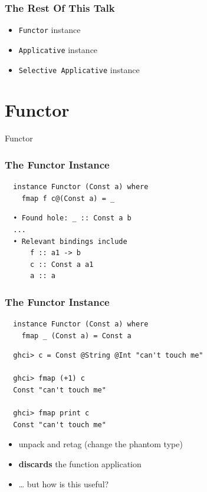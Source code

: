 \documentclass[aspectratio=169]{beamer}
\begin{document}
\begin{frame}
  \frametitle{The Rest Of This Talk}
  \begin{itemize}
  \item \texttt{Functor} instance
  \item \texttt{Applicative} instance
  \item \texttt{Selective Applicative} instance
  \end{itemize}
\end{frame}

\section{Functor}
\begin{frame}
  \begin{center}
    \Huge Functor
  \end{center}
\end{frame}

\begin{frame}[fragile,t]
  \frametitle{The Functor Instance}
  \begin{verbatim}
  instance Functor (Const a) where
    fmap f c@(Const a) = _
  \end{verbatim}
  \vspace{5mm}
  \begin{verbatim}
  • Found hole: _ :: Const a b
  ...
  • Relevant bindings include
      f :: a1 -> b
      c :: Const a a1
      a :: a
  \end{verbatim}
\end{frame}

\begin{frame}[fragile,t]
  \frametitle{The Functor Instance}
  \begin{verbatim}
  instance Functor (Const a) where
    fmap _ (Const a) = Const a
  \end{verbatim}
  \vspace{5mm}
  \begin{verbatim}
  ghci> c = Const @String @Int "can't touch me"

  ghci> fmap (+1) c
  Const "can't touch me"

  ghci> fmap print c
  Const "can't touch me"
  \end{verbatim}
  \vfill
  \begin{itemize}
  \item unpack and retag (change the phantom type)
  \item \textbf{discards} the function application
  \item \dots{} but how is this useful?
  \end{itemize}
\end{frame}
\end{document}

